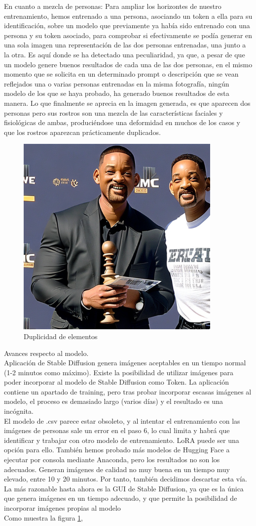 En cuanto a mezcla de personas: Para ampliar los horizontes de nuestro entrenamiento, hemos entrenado a una persona, asociando un token a ella para su identificación, sobre un modelo que previamente ya había sido entrenado con una persona y su token asociado, para comprobar si efectivamente se podía generar en una sola imagen una representación de las dos personas entrenadas, una junto a la otra. Es aquí donde se ha detectado una peculiaridad, ya que, a pesar de que un modelo genere buenos resultados de cada una de las dos personas, en el mismo momento que se solicita en un determinado prompt o descripción que se vean reflejados una o varias personas entrenadas en la misma fotografía, ningún modelo de los que se haya probado, ha generado buenos resultados de esta manera. Lo que finalmente se aprecia en la imagen generada, es que aparecen dos personas pero sus rostros son una mezcla de las características faciales y fisiológicas de ambas, produciéndose una deformidad en muchos de los casos y que los rostros aparezcan prácticamente duplicados.
\begin{figure}[h]
	\centering
	\includegraphics[width = 0.4
	\textwidth]{Imagenes/Vectorial/duplicidad_will.png}
		\caption{Duplicidad de elementos}
	\label{fig:sampleImage}
\end{figure}

Avances respecto al modelo.\\

Aplicación de Stable Diffusion genera imágenes aceptables en un tiempo normal (1-2 minutos como máximo). Existe la posibilidad de utilizar imágenes para poder incorporar al modelo de Stable Diffusion como Token. La aplicación contiene un apartado de training, pero tras probar incorporar escasas imágenes al modelo, el proceso es demasiado largo (varios días) y el resultado es una incógnita. \\

El modelo de .csv parece estar obsoleto, y al intentar el entrenamiento con las imágenes de personas sale un error en el paso 6, lo cual limita y habrá que identificar y trabajar con otro modelo de entrenamiento. LoRA puede ser una opción para ello.
También hemos probado más modelos de Hugging Face a ejecutar por consola mediante Anaconda, pero los resultados no son los adecuados. Generan imágenes de calidad no muy buena en un tiempo muy elevado, entre 10 y 20 minutos. Por tanto, también decidimos descartar esta vía. 
La más razonable hasta ahora es la GUI de Stable Diffusion, ya que es la única que genera imágenes en un tiempo adecuado, y que permite la posibilidad de incorporar imágenes propias al modelo\\




 Como muestra la figura \ref{fig:sampleImage},
